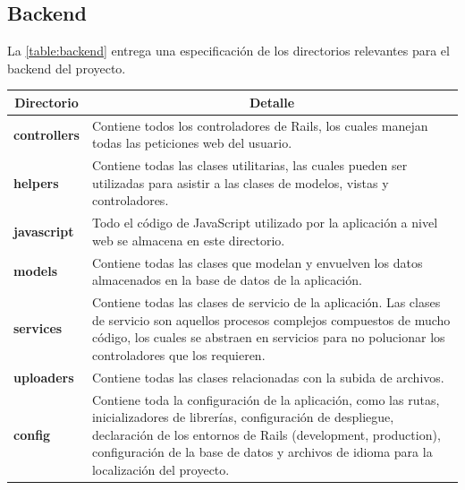 \subsection{Backend}
La \autoref{table:backend} entrega una especificación de los directorios relevantes para el backend del proyecto.

\begin{center}
  \begin{tabular}{ | l | p{12.5cm} |}
    \hline
    \multicolumn{1}{|c|}{\textbf{Directorio}} & \multicolumn{1}{|c|}{\textbf{Detalle}} \\
    \hline
    
    {\textbf{controllers}} & Contiene todos los controladores de Rails, los cuales manejan todas las peticiones web del usuario. \\ \hline
    
    {\textbf{helpers}} & Contiene todas las clases utilitarias, las cuales pueden ser utilizadas para asistir a las clases de modelos, vistas y controladores. \\ \hline
    
    {\textbf{javascript}} & Todo el código de JavaScript utilizado por la aplicación a nivel web se almacena en este directorio.\\ \hline
    
    {\textbf{models}} & Contiene todas las clases que modelan y envuelven los datos almacenados en la base de datos de la aplicación. \\ \hline
    
    {\textbf{services}} & Contiene todas las clases de servicio de la aplicación. Las clases de servicio son aquellos procesos complejos compuestos de mucho código, los cuales se abstraen en servicios para no polucionar los controladores que los requieren. \\ \hline
    
    {\textbf{uploaders}} & Contiene todas las clases relacionadas con la subida de archivos. \\ \hline
    
    {\textbf{config}} & Contiene toda la configuración de la aplicación, como las rutas, inicializadores de librerías, configuración de despliegue, declaración de los entornos de Rails (development, production), configuración de la base de datos y archivos de idioma para la localización del proyecto.\\ \hline
  \end{tabular}
  
  \label{table:backend}
\end{center}

